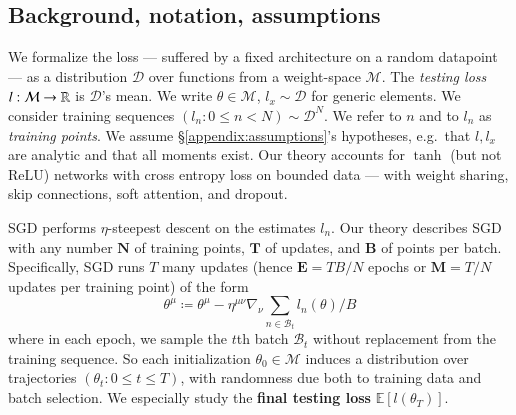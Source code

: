 \documentclass[anon,12pt]{colt2021} %
\newcommand{\expc}{\mathbb{E}}
\newcommand{\Bb}{\mathcal{B}}
\newcommand{\Dd}{\mathcal{D}}
\newcommand{\Mm}{\mathcal{M}}
\begin{document}
        \subsection{Background, notation, assumptions}\label{sect:background}

    
            We formalize the loss --- suffered by a fixed architecture on a
            random datapoint --- as a distribution $\Dd$ over functions from a
            weight-space $\Mm$.  The \emph{testing loss} $l:\Mm\to\RR$ is
            $\Dd$'s mean.  We write $\theta\in\Mm$, $l_x\sim\Dd$ for generic
            elements.
            We consider training sequences $(l_n: 0\leq n<N) \sim \Dd^N$.  We
            refer to $n$ and to $l_n$ as \emph{training points}.  We assume
            \S\ref{appendix:assumptions}'s hypotheses, e.g.\ that $l, l_x$ are
            analytic and that all moments exist.
            Our theory accounts for $\tanh$ (but not $\text{ReLU}$) networks
            with cross entropy loss on bounded data --- with weight
            sharing, skip connections, soft attention, and dropout.  


            SGD performs $\eta$-steepest descent on the estimates $l_n$.  Our
            theory describes SGD with any number
                $\mathbf{N}$ of training points,
                $\mathbf{T}$ of updates, and 
                $\mathbf{B}$ of points per batch.
            Specifically, SGD runs $T$ many updates (hence
                $\mathbf{E}=TB/N$ epochs or
                $\mathbf{M}=T/N$ updates per training point) of the form
            $$
                \textstyle
                \theta^\mu
                \coloneqq
                \theta^\mu -
                \eta^{\mu\nu} \nabla_\nu
                    \sum_{n\in \Bb_t} l_n(\theta) / B
            $$
            where in each epoch, we sample the $t$th batch $\Bb_t$ without
            replacement from the training sequence.  So each initialization
            $\theta_0 \in \Mm$ induces a distribution over
            trajectories $(\theta_t: 0\leq t \leq T)$, with randomness due both
            to training data and batch selection.  We especially study
            the \textbf{final testing loss} $\expc[l(\theta_T)]$.
\end{document}
